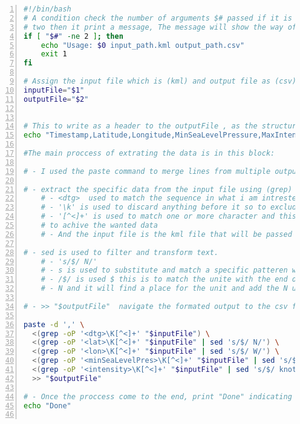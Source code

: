 \documentclass[12pt]{article}
\begin{document}
\begin{lstlisting}[language=bash,captionpos=b, caption={KML to CSV Conversion Script} breakline=true , numbers=left, numberstyle=\tiny, stepnumber=1, numbersep=5pt]
#!/bin/bash
# A condition check the number of arguments $# passed if it is not 
# two then it print a message, The message will show the way of use and exit 
if [ "$#" -ne 2 ]; then
    echo "Usage: $0 input_path.kml output_path.csv"
    exit 1
fi

# Assign the input file which is (kml) and output file as (csv)
inputFile="$1" 
outputFile="$2" 


# This to write as a header to the outputFile , as the structure for the data structure extracted.
echo "Timestamp,Latitude,Longitude,MinSeaLevelPressure,MaxIntensity" > "$outputFile"

#The main proccess of extrating the data is in this block:

# - I used the paste command to merge lines from multiple outputs, seperated by commas,

# - extract the specific data from the input file using (grep) with Perl-compatible regular expressions (-oP).
    # - <dtg>  used to match the sequence in what i am intrested in 
    # - '\k' is used to discard anything before it so to exclude <dtg>
    # - '[^<]+' is used to match one or more character and this #specifically [^<] means that i am only intrested in things without <
    # to achive the wanted data 
    # - And the input file is the kml file that will be passed this was used for the rest of the data but the tag was changed with each wanted data the wanted information
    
# - sed is used to filter and transform text.
    # - 's/$/ N/' 
    # - s is used to substitute and match a specific patteren with a new text
    # - /$/ is used $ this is to match the unite with the end of the line 
    # - N and it will find a place for the unit and add the N unit in the end of a text, this was used for all data with units so all except the timestamt.
    
# - >> "$outputFile"  navigate the formated output to the csv file.

paste -d ',' \
  <(grep -oP '<dtg>\K[^<]+' "$inputFile") \
  <(grep -oP '<lat>\K[^<]+' "$inputFile" | sed 's/$/ N/') \
  <(grep -oP '<lon>\K[^<]+' "$inputFile" | sed 's/$/ W/') \
  <(grep -oP '<minSeaLevelPres>\K[^<]+' "$inputFile" | sed 's/$/ mb/') \
  <(grep -oP '<intensity>\K[^<]+' "$inputFile" | sed 's/$/ knots/') \
  >> "$outputFile"

# - Once the proccess come to the end, print "Done" indicating that the process was successfull.
echo "Done" 


\end{lstlisting}
\end{document}
